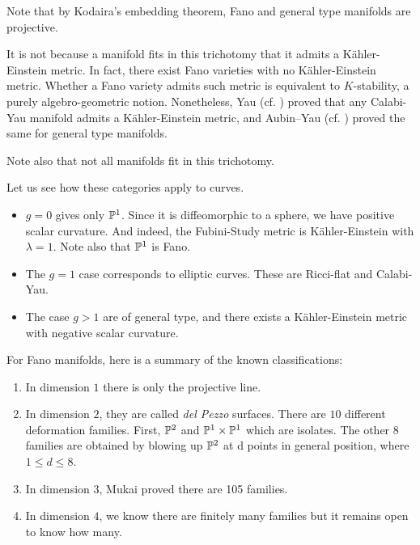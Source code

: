 Note that by Kodaira's embedding theorem, Fano and general type manifolds are projective.
\begin{caution}
	It is not because a manifold fits in this trichotomy that it admits a Kähler-Einstein metric. In fact, there exist Fano varieties with no Kähler-Einstein metric. Whether a Fano variety admits such metric is equivalent to $K$-stability, a purely algebro-geometric notion. Nonetheless, Yau (cf. \cite{Yau1978}) proved that any Calabi-Yau manifold admits a Kähler-Einstein metric, and Aubin--Yau (cf. \cite{Aubin76,Yau1978}) proved the same for general type manifolds.
	
	Note also that not all manifolds fit in this trichotomy. 
\end{caution}
\begin{example}[Curves]
	Let us see how these categories apply to curves.
	\begin{itemize}
		\item $g=0$ gives only $\mathbb{P}^1$. Since it is diffeomorphic to a sphere, we have positive scalar curvature. And indeed, the Fubini-Study metric is Kähler-Einstein with $\lambda=1$. Note also that $\mathbb{P}^1$ is Fano.
		\item The $g=1$ case corresponds to elliptic curves. These are Ricci-flat and Calabi-Yau.
		\item The case $g>1$ are of general type, and there exists a Kähler-Einstein metric with negative scalar curvature.\qedbarhere
	\end{itemize}
\end{example}
For Fano manifolds, here is a summary of the known classifications:
\begin{enumerate}
	\item In dimension $1$ there is only the projective line.
	\item In dimension $2$, they are called \emph{del Pezzo} surfaces. There are $10$ different deformation families. First, $\mathbb{P}^2$ and $\mathbb{P}^1\times\mathbb{P}^1$ which are isolates. The other $8$ families are obtained by blowing up $\mathbb{P}^2$ at d points in general position, where $1\leq d\leq 8$.
	\item In dimension $3$, Mukai proved there are 105 families.
	\item In dimension $4$, we know there are finitely many families but it remains open to know how many.
\end{enumerate}

